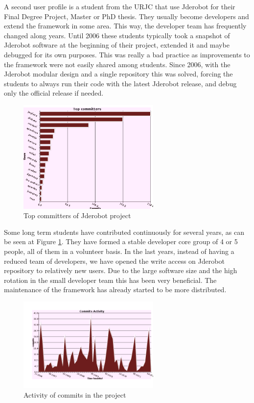 \documentclass[twocolumn]{svjour3}          %
\begin{document}
A second user profile is a student from the URJC that use Jderobot for their Final Degree Project, Master or PhD thesis. They usually become developers and extend the framework in some area. This way, the developer team has frequently changed along years. Until 2006 these students typically took a snapshot of Jderobot software at the beginning of their project, extended it and maybe debugged for its own purposes. This was really a bad practice as improvements to the framework were not easily shared among students. Since 2006, with the Jderobot modular design and a single repository this was solved, forcing the students to always run their code with the latest Jderobot release, and debug only the official release if needed.

\begin{figure}
  \includegraphics[width=7cm]{figs/svn_top-committers.png}
\caption{Top committers of Jderobot project}
\label{fig:svn-topcommiters}
\end{figure}

Some long term students have contributed continuously for several years, as can be seen at Figure \ref{fig:svn-topcommiters}. They have formed a stable developer core group of 4 or 5 people, all of them in a volunteer basis. In the last years, instead of having a reduced team of developers, we have opened the write access on Jderobot repository to relatively new users. Due to the large software size and the high rotation in the small developer team this has been very beneficial. The maintenance of the framework has already started to be more distributed.

\begin{figure}
  \includegraphics[width=7cm]{figs/svn_activity.png}
\caption{Activity of commits in the project}
\label{fig:svn-activity}
\end{figure}
\end{document}
